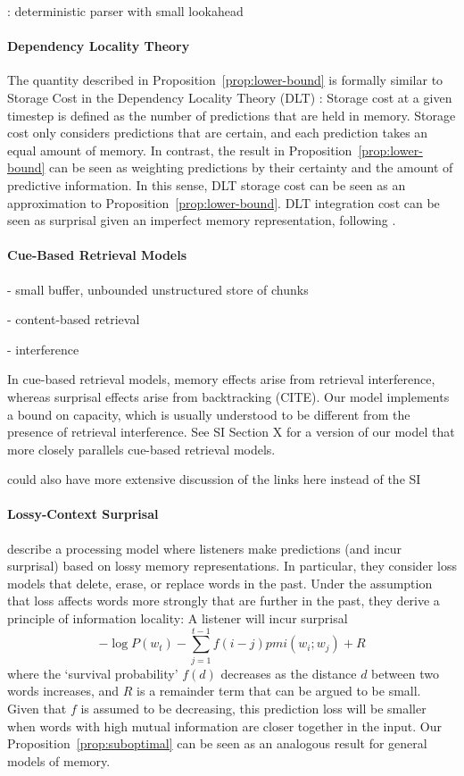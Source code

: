 \cite{boston2012computational}

\cite{just1992capacity}

\cite{marcus1978theory}: deterministic parser with small lookahead

\paragraph{Dependency Locality Theory}
The quantity described in Proposition~\ref{prop:lower-bound} is formally similar to Storage Cost in the Dependency Locality Theory (DLT) \citep{gibson-linguistic-1998}: Storage cost at a given timestep is defined as the number of predictions that are held in memory.
Storage cost only considers predictions that are certain, and each prediction takes an equal amount of memory.
In contrast, the result in Proposition~\ref{prop:lower-bound} can be seen as weighting predictions by their certainty and the amount of predictive information.
In this sense, DLT storage cost can be seen as an approximation to Proposition~\ref{prop:lower-bound}.
DLT integration cost can be seen as surprisal given an imperfect memory representation, following \cite{futrell-noisy-context-2017}.

\paragraph{Cue-Based Retrieval Models}
- small buffer, unbounded unstructured store of chunks

- content-based retrieval

- interference


In cue-based retrieval models, memory effects arise from retrieval interference, whereas surprisal effects arise from backtracking (CITE).
Our model implements a bound on capacity, which is usually understood to be different from the presence of retrieval interference.
See SI Section X for a version of our model that more closely parallels cue-based retrieval models.

could also have more extensive discussion of the links here instead of the SI


\paragraph{Lossy-Context Surprisal}
\citet{futrell-noisy-context-2017} describe a processing model where listeners make predictions (and incur surprisal) based on lossy memory representations.
In particular, they consider loss models that delete, erase, or replace words in the past.
Under the assumption that loss affects words more strongly that are further in the past, they derive a principle of information locality:
A listener will incur surprisal
$$ -\log P(w_t) - \sum_{j=1}^{t-1} f(i-j) pmi(w_i; w_j) + R$$
where the `survival probability' $f(d)$ decreases as the distance $d$ between two words increases, and $R$ is a remainder term that can be argued to be small.
Given that $f$ is assumed to be decreasing, this prediction loss will be smaller when words with high mutual information are closer together in the input.
Our Proposition~\ref{prop:suboptimal} can be seen as an analogous result for general models of memory.


